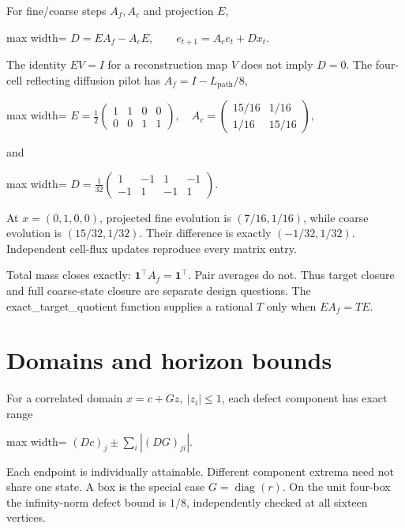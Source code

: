 \documentclass[
  11pt,
  a4paper,
]{report}
\begin{document}
For fine/coarse steps \(A_f,A_c\) and projection \(E\), \begin{center}
\begin{adjustbox}{max width=\linewidth}
$\displaystyle
D=EA_f-A_cE,\qquad e_{t+1}=A_ce_t+Dx_t.
$
\end{adjustbox}
\end{center} The identity \(EV=I\) for a reconstruction map \(V\) does not imply
\(D=0\). The four-cell reflecting diffusion pilot has
\(A_f=I-L_{\mathrm{path}}/8\), \begin{center}
\begin{adjustbox}{max width=\linewidth}
$\displaystyle
E=\frac12\begin{pmatrix}1&1&0&0\\0&0&1&1\end{pmatrix},\quad
A_c=\begin{pmatrix}15/16&1/16\\1/16&15/16\end{pmatrix},
$
\end{adjustbox}
\end{center} and \begin{center}
\begin{adjustbox}{max width=\linewidth}
$\displaystyle
D=\frac1{32}\begin{pmatrix}1&-1&1&-1\\-1&1&-1&1\end{pmatrix}.
$
\end{adjustbox}
\end{center} At \(x=(0,1,0,0)\), projected fine evolution is \((7/16,1/16)\),
while coarse evolution is \((15/32,1/32)\). Their difference is exactly
\((-1/32,1/32)\). Independent cell-flux updates reproduce every matrix
entry.

Total mass closes exactly: \(\mathbf1^\top A_f=\mathbf1^\top\). Pair
averages do not. Thus target closure and full coarse-state closure are
separate design questions. The exact\_target\_quotient function supplies
a rational \(T\) only when \(EA_f=TE\).

\hypertarget{domains-and-horizon-bounds}{%
\section{Domains and horizon bounds}\label{domains-and-horizon-bounds}}

For a correlated domain \(x=c+Gz,\ |z_i|\le1\), each defect component
has exact range \begin{center}
\begin{adjustbox}{max width=\linewidth}
$\displaystyle
(Dc)_j\pm\sum_i |(DG)_{ji}|.
$
\end{adjustbox}
\end{center} Each endpoint is individually attainable. Different component extrema
need not share one state. A box is the special case
\(G=\operatorname{diag}(r)\). On the unit four-box the infinity-norm
defect bound is \(1/8\), independently checked at all sixteen vertices.
\end{document}
